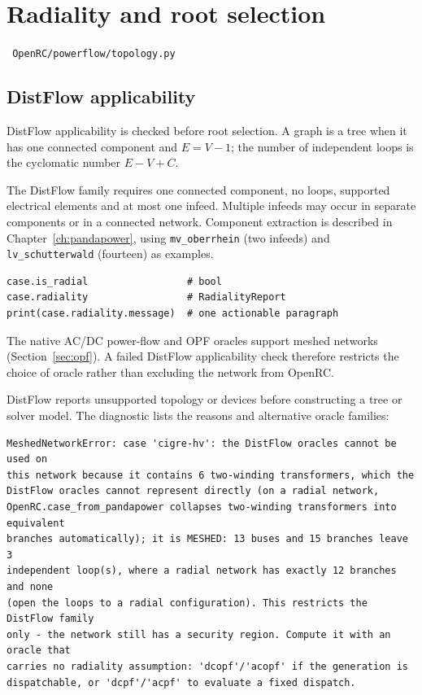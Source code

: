 \documentclass[11pt,a4paper]{report}
\newcommand{\code}[1]{\texttt{\small #1}}
\newcommand{\file}[1]{\texttt{\small\color{nbgrey} #1}}
\begin{document}
\section{Radiality and root selection}
\label{sec:radiality}

\file{OpenRC/powerflow/topology.py}

\subsection{DistFlow applicability}

DistFlow applicability is checked before root selection. A graph is a tree
when it has one connected component and $E = V - 1$; the number of independent
loops is the cyclomatic number $E - V + C$.

The DistFlow family requires one connected component, no loops, supported
electrical elements and at most one infeed. Multiple infeeds may occur in
separate components or in a connected network. Component extraction is
described in Chapter~\ref{ch:pandapower}, using \code{mv\_oberrhein}
(two infeeds) and \code{lv\_schutterwald} (fourteen) as examples.

\begin{lstlisting}
case.is_radial                 # bool
case.radiality                 # RadialityReport
print(case.radiality.message)  # one actionable paragraph
\end{lstlisting}

The native AC/DC power-flow and OPF oracles support meshed networks
(Section~\ref{sec:opf}). A failed DistFlow applicability check therefore
restricts the choice of oracle rather than excluding the network from OpenRC.

DistFlow reports unsupported topology or devices before constructing a tree or
solver model. The diagnostic lists the reasons and alternative oracle families:

\begin{lstlisting}[style=sh]
MeshedNetworkError: case 'cigre-hv': the DistFlow oracles cannot be used on
this network because it contains 6 two-winding transformers, which the
DistFlow oracles cannot represent directly (on a radial network,
OpenRC.case_from_pandapower collapses two-winding transformers into equivalent
branches automatically); it is MESHED: 13 buses and 15 branches leave 3
independent loop(s), where a radial network has exactly 12 branches and none
(open the loops to a radial configuration). This restricts the DistFlow family
only - the network still has a security region. Compute it with an oracle that
carries no radiality assumption: 'dcopf'/'acopf' if the generation is
dispatchable, or 'dcpf'/'acpf' to evaluate a fixed dispatch.
\end{lstlisting}
\end{document}
